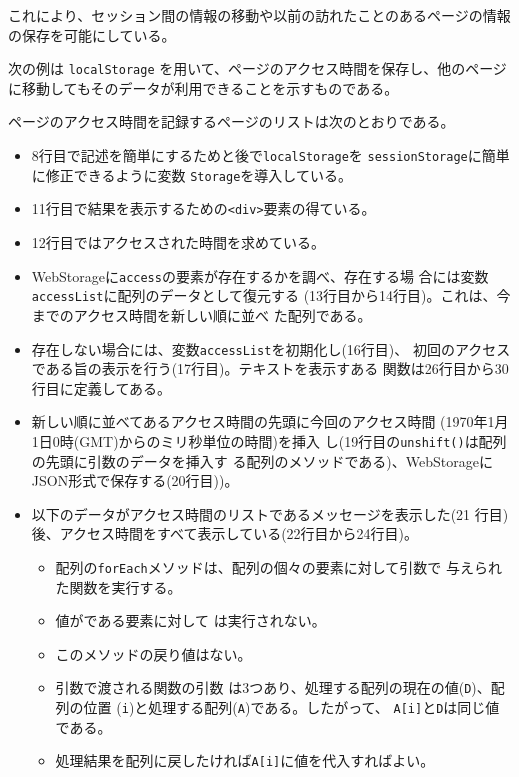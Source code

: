これにより、セッション間の情報の移動や以前の訪れたことのあるページの情報
の保存を可能にしている。

\begin{Exec}\upshape\label{storageEx}
次の例は \texttt{localStorage} を用いて、ページのアクセス時間を保存し、他のページ
 に移動してもそのデータが利用できることを示すものである。

ページのアクセス時間を記録するページのリストは次のとおりである。
 \begin{itemize}
	\item 8行目で記述を簡単にするためと後で\texttt{localStorage}を
				\texttt{sessionStorage}に簡単に修正できるように変数
				\texttt{Storage}を導入している。
	\item 11行目で結果を表示するための\texttt{<div>}要素の得ている。
	\item 12行目ではアクセスされた時間を求めている。
	\item WebStorageに\texttt{access}の要素が存在するかを調べ、存在する場
				合には変数\texttt{accessList}に配列のデータとして復元する
				(13行目から14行目)。これは、今までのアクセス時間を新しい順に並べ
				た配列である。
	\item 存在しない場合には、変数\texttt{accessList}を初期化し(16行目)、
				初回のアクセスである旨の表示を行う(17行目)。テキストを表示すある
				関数は26行目から30行目に定義してある。
	\item 新しい順に並べてあるアクセス時間の先頭に今回のアクセス時間
				(1970年1月1日0時(GMT)からのミリ秒単位の時間)を挿入
				し(19行目の\texttt{unshift()}は配列の先頭に引数のデータを挿入す
				る配列のメソッドである)、WebStorageにJSON形式で保存する(20行目))。
	\item 以下のデータがアクセス時間のリストであるメッセージを表示した(21
				行目)後、アクセス時間をすべて表示している(22行目から24行目)。
\begin{itemize}
 \item 配列の\texttt{forEach}メソッドは、配列の個々の要素に対して引数で
			 与えられた関数を実行する。
 \item 値がである要素に対して
			 は実行されない。
 \item このメソッドの戻り値はない。
 \item 引数で渡される関数の引数
				は3つあり、処理する配列の現在の値(\texttt{D})、配列の位置
			 (\texttt{i})と処理する配列(\texttt{A})である。したがって、
			 \texttt{A[i]}と\texttt{D}は同じ値である。
 \item 処理結果を配列に戻したければ\texttt{A[i]}に値を代入すればよい。

\end{itemize}
\end{itemize}
\end{Exec}
